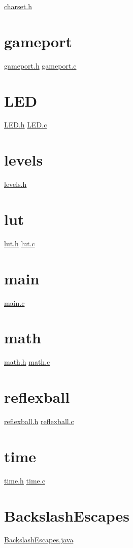 \underline{charset.h}

\section{gameport}
\label{gameport}

\underline{gameport.h}
\underline{gameport.c}

\section{LED}
\label{LED}

\underline{LED.h}
\underline{LED.c}

\section{levels}
\label{levels}

\underline{levels.h}

\section{lut}
\label{lut}

\underline{lut.h}
\underline{lut.c}

\section{main}
\label{main}

\underline{main.c}

\section{math}
\label{math}

\underline{math.h}
\underline{math.c}

\section{reflexball}
\label{reflexball}

\underline{reflexball.h}
\underline{reflexball.c}

\section{time}
\label{time}

\underline{time.h}
\underline{time.c}

\section{BackslashEscapes}
\label{BackslashEscapes}

\underline{BackslashEscapes.java}
\begin{lstlisting}[language=Java]

\end{lstlisting}

